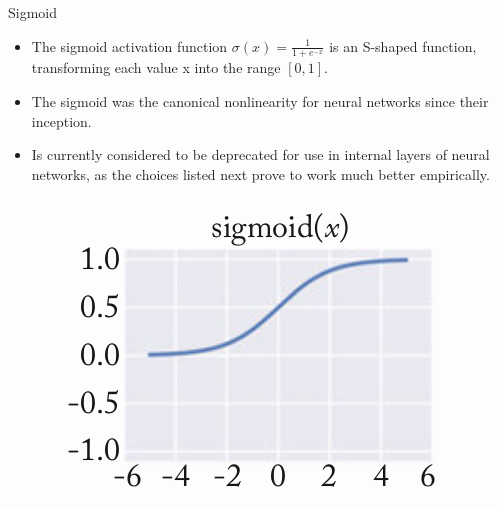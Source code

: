 \documentclass[handout]{beamer}
\begin{document}
\begin{frame}{Sigmoid}
\begin{scriptsize}
\begin{itemize}
\item The sigmoid activation function $\sigma(x) = \frac{1}{1+e^{-x}}$ is an S-shaped function, transforming each value x into the range $[0, 1]$.
\item The sigmoid was the canonical nonlinearity for neural networks since their inception.
\item Is currently considered to be deprecated for use in internal layers of neural networks, as the choices listed next prove to work much better empirically.
\end{itemize}

\begin{figure}[htb]
	\centering
	 \includegraphics[scale=0.3]{pics/sigmoid2.png}
\end{figure}

\end{scriptsize}
\end{frame}
\end{document}

